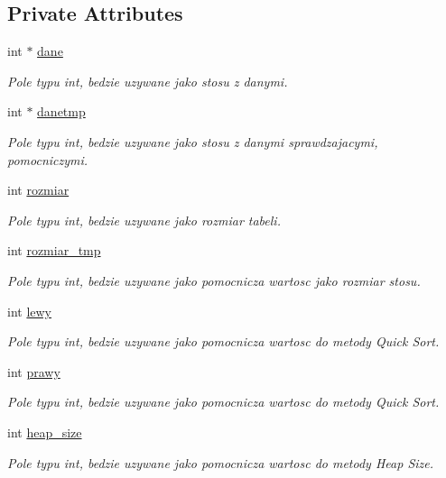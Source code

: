 \subsection*{Private Attributes}
\begin{DoxyCompactItemize}
\item 
int $\ast$ \hyperlink{classstos__tablica_a008b0f69384d5d987782c2f24fcbd387}{dane}
\begin{DoxyCompactList}\small\item\em Pole typu int, bedzie uzywane jako stosu z danymi. \end{DoxyCompactList}\item 
int $\ast$ \hyperlink{classstos__tablica_a2ee83414df31c2f56383199a5d47c755}{danetmp}
\begin{DoxyCompactList}\small\item\em Pole typu int, bedzie uzywane jako stosu z danymi sprawdzajacymi, pomocniczymi. \end{DoxyCompactList}\item 
int \hyperlink{classstos__tablica_aa9c1d33bd477174602d2632c74ebea9c}{rozmiar}
\begin{DoxyCompactList}\small\item\em Pole typu int, bedzie uzywane jako rozmiar tabeli. \end{DoxyCompactList}\item 
int \hyperlink{classstos__tablica_adcfe2091d485a93da47eb9fb6a337b06}{rozmiar\-\_\-tmp}
\begin{DoxyCompactList}\small\item\em Pole typu int, bedzie uzywane jako pomocnicza wartosc jako rozmiar stosu. \end{DoxyCompactList}\item 
int \hyperlink{classstos__tablica_addee4392050e497f2b9f07a5e7a17606}{lewy}
\begin{DoxyCompactList}\small\item\em Pole typu int, bedzie uzywane jako pomocnicza wartosc do metody Quick Sort. \end{DoxyCompactList}\item 
int \hyperlink{classstos__tablica_aab32beac5ab0f185fb27492736798749}{prawy}
\begin{DoxyCompactList}\small\item\em Pole typu int, bedzie uzywane jako pomocnicza wartosc do metody Quick Sort. \end{DoxyCompactList}\item 
int \hyperlink{classstos__tablica_ae1737beb175c9041e44ff8b374fa3565}{heap\-\_\-size}
\begin{DoxyCompactList}\small\item\em Pole typu int, bedzie uzywane jako pomocnicza wartosc do metody Heap Size. \end{DoxyCompactList}\end{DoxyCompactItemize}


